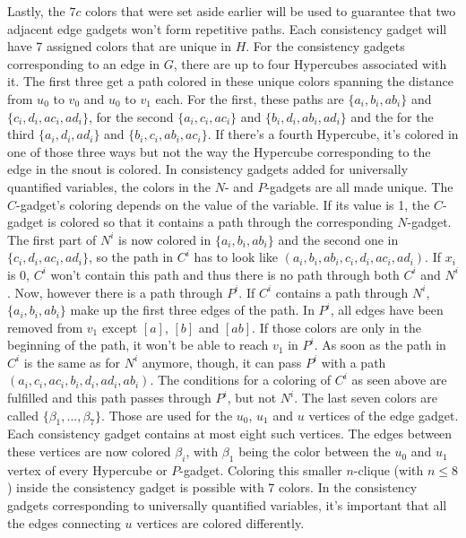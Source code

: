 \documentclass[12pt,a4paper]{article}
\begin{document}
\newline
Lastly, the $7c$ colors that were set aside earlier will be used to guarantee that two adjacent edge gadgets won't form repetitive paths. Each consistency gadget will have 7 assigned colors that are unique in $H$. For the consistency gadgets corresponding to an edge in $G$, there are up to four Hypercubes associated with it. The first three get a path colored in these unique colors spanning the distance from $u_0$ to $v_0$ and $u_0$ to $v_1$ each. For the first, these paths are $ \{a_i, b_i, ab_i \}$ and $ \{c_i, d_i, ac_i, ad_i \}$, for the second $ \{a_i, c_i, ac_i \}$ and $ \{b_i, d_i, ab_i, ad_i \}$ and the for the third $ \{a_i, d_i, ad_i \}$ and $ \{b_i, c_i, ab_i, ac_i \}$. If there's a fourth Hypercube, it's colored in one of those three ways but not the way the Hypercube corresponding to the edge in the snout is colored. In consistency gadgets added for universally quantified variables, the colors in the $N$- and $P$-gadgets are all made unique. The $C$-gadget's coloring depends on the value of the variable. If its value is 1, the $C$-gadget is colored so that it contains a path through the corresponding $N$-gadget. The first part of $N^i$ is now colored in $ \{a_i, b_i, ab_i \}$ and the second one in $ \{c_i, d_i, ac_i, ad_i \}$, so the path in $C^i$ has to look like $(a_i, b_i, ab_i, c_i, d_i, ac_i, ad_i)$. If $x_i$ is 0, $C^i$ won't contain this path and thus there is no path through both $C^i$ and $N^i$. Now, however there is a path through $P^i$. If $C^i$ contains a path through $N^i$, $ \{a_i, b_i, ab_i \}$ make up the first three edges of the path. In $P^i$, all edges have been removed from $v_1$ except $[a]$, $[b]$ and $[ab]$. If those colors are only in the beginning of the path, it won't be able to reach $v_1$ in $P^i$. As soon as the path in $C^i$ is the same as for $N^i$ anymore, though, it can pass $P^i$ with a path $(a_i, c_i, ac_i, b_i, d_i, ad_i, ab_i)$. The conditions for a coloring of $C^i$ as seen above are fulfilled and this path passes through $P^i$, but not $N^i$.
\newline
The last seven colors are called $ \{ \beta_1, ..., \beta_7 \}$. Those are used for the $u_0$, $u_1$ and $u$ vertices of the edge gadget. Each consistency gadget contains at most eight such vertices. The edges between these vertices are now colored $\beta_i$, with $\beta_1$ being the color between the $u_0$ and $u_1$ vertex of every Hypercube or $P$-gadget. Coloring this smaller $n$-clique (with $n \leq 8$) inside the consistency gadget is possible with 7 colors. In the consistency gadgets corresponding to universally quantified variables, it's important that all the edges connecting $u$ vertices are colored differently.
\end{document}
